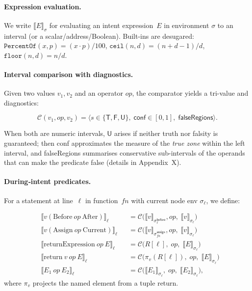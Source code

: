 \documentclass[10pt, conference]{IEEEtran}
\begin{document}
\paragraph{Expression evaluation.}
We write \(\llbracket E \rrbracket_\sigma\) for evaluating an
intent expression~\(E\) in environment \(\sigma\) to an interval
(or a scalar/address/Boolean).  Built-ins are desugared:
\(\texttt{PercentOf}(x,p)=(x\cdot p)/100\),
\(\texttt{ceil}(n,d)=(n+d-1)/d\),
\(\texttt{floor}(n,d)=n/d\).

\paragraph{Interval comparison with diagnostics.}
Given two values \(v_1,v_2\) and an operator \(op\),
the comparator yields a tri-value and diagnostics:

\[
\mathcal{C}(v_1,op,v_2)
 = \langle s\in\{\mathsf{T,F,U}\},\;
    \textsf{conf}\in[0,1],\;
    \textsf{falseRegions}\rangle.
\]

When both are numeric intervals, \(\mathsf{U}\) arises if neither
truth nor falsity is guaranteed; then \textsf{conf} approximates
the measure of the \emph{true zone} within the left interval, and
\textsf{falseRegions} summarises conservative sub-intervals of the
operands that can make the predicate false (details in Appendix~X).

\paragraph{During‑intent predicates.}
For a statement at line~\(\ell\) in function~\(\mathit{fn}\)
with current node env \(\sigma_\ell\), we define:

\[
\begin{aligned}
&\llbracket v(\mathrm{Before}\ op\ \mathrm{After})\rrbracket_{\ell}
  &&= \mathcal{C}\bigl(
      \llbracket v \rrbracket_{\sigma^{\mathsf{before}}_{\ell}}\!,
      op,\;
      \llbracket v \rrbracket_{\sigma_\ell}\bigr)\\[0.2em]
&\llbracket v(\mathrm{Assign}\ op\ \mathrm{Current})\rrbracket_{\ell}
  &&= \mathcal{C}\bigl(
      \llbracket v \rrbracket_{\sigma^{\mathsf{assign}}_{\mathit{fn}}}\!,
      op,\;
      \llbracket v \rrbracket_{\sigma_\ell}\bigr)\\[0.2em]
&\llbracket \mathrm{returnExpression}\ op\ E \rrbracket_{\ell}
  &&= \mathcal{C}\bigl(R[\ell],\; op,\; \llbracket E \rrbracket_{\sigma_\ell}\bigr)\\[0.2em]
&\llbracket \mathrm{return}\ v\ op\ E \rrbracket_{\ell}
  &&= \mathcal{C}\bigl(\pi_v(R[\ell]),\; op,\; \llbracket E \rrbracket_{\sigma_\ell}\bigr)\\[0.2em]
&\llbracket E_1\ op\ E_2 \rrbracket_{\ell}
  &&= \mathcal{C}\bigl(\llbracket E_1 \rrbracket_{\sigma_\ell},\; op,\;
                         \llbracket E_2 \rrbracket_{\sigma_\ell}\bigr),
\end{aligned}
\]
where \(\pi_v\) projects the named element from a tuple return.
\end{document}
